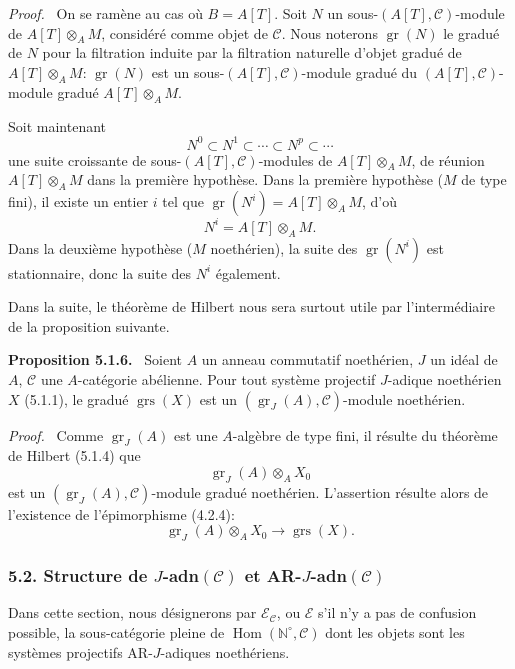 \documentclass[11pt]{article}
\newenvironment{statement}[1]{\par\medskip\noindent\textbf{#1.}\ }{\par\medskip}
\newenvironment{prooftext}[1][Proof]{\par\noindent\emph{#1.}\ }{\par\medskip}
\DeclareMathOperator{\Hom}{Hom}
\providecommand{\gr}{\operatorname{gr}}
\providecommand{\Hom}{\operatorname{Hom}}
\providecommand{\gr}{\operatorname{gr}}
\providecommand{\gr}{\operatorname{gr}}
\providecommand{\grs}{\operatorname{grs}}
\begin{document}
\begin{prooftext}
On se ramène au cas où \(B=A[T]\). Soit \(N\) un sous-\((A[T],\mathcal C)\)-module de \(A[T]\otimes_A M\), considéré comme objet de \(\mathcal C\). Nous noterons \(\gr(N)\) le gradué de \(N\) pour la filtration induite par la filtration naturelle d'objet gradué de \(A[T]\otimes_A M\): \(\gr(N)\) est un sous-\((A[T],\mathcal C)\)-module gradué du \((A[T],\mathcal C)\)-module gradué \(A[T]\otimes_A M\).

Soit maintenant
\[
N^0\subset N^1\subset\cdots\subset N^p\subset\cdots
\]
une suite croissante de sous-\((A[T],\mathcal C)\)-modules de \(A[T]\otimes_A M\), de réunion \(A[T]\otimes_A M\) dans la première hypothèse. Dans la première hypothèse (\(M\) de type fini), il existe un entier \(i\) tel que \(\gr(N^i)=A[T]\otimes_A M\), d'où
\[
N^i=A[T]\otimes_A M.
\]
Dans la deuxième hypothèse (\(M\) noethérien), la suite des \(\gr(N^i)\) est stationnaire, donc la suite des \(N^i\) également.

Dans la suite, le théorème de Hilbert nous sera surtout utile par l'intermédiaire de la proposition suivante.
\end{prooftext}

\begin{statement}{Proposition 5.1.6}
Soient \(A\) un anneau commutatif noethérien, \(J\) un idéal de \(A\), \(\mathcal C\) une \(A\)-catégorie abélienne. Pour tout système projectif \(J\)-adique noethérien \(X\) (5.1.1), le gradué \(\grs(X)\) est un \((\gr_J(A),\mathcal C)\)-module noethérien.
\end{statement}

\begin{prooftext}
Comme \(\gr_J(A)\) est une \(A\)-algèbre de type fini, il résulte du théorème de Hilbert (5.1.4) que
\[
\gr_J(A)\otimes_A X_0
\]
est un \((\gr_J(A),\mathcal C)\)-module gradué noethérien. L'assertion résulte alors de l'existence de l'épimorphisme (4.2.4):
\[
\gr_J(A)\otimes_A X_0\longrightarrow \grs(X).
\]
\end{prooftext}

\subsubsection*{5.2. Structure de \(J\)-adn\((\mathcal C)\) et AR-\(J\)-adn\((\mathcal C)\)}

Dans cette section, nous désignerons par \(\mathcal E_{\mathcal C}\), ou \(\mathcal E\) s'il n'y a pas de confusion possible, la sous-catégorie pleine de \(\Hom(\mathbb N^\circ,\mathcal C)\) dont les objets sont les systèmes projectifs AR-\(J\)-adiques noethériens.
\end{document}
